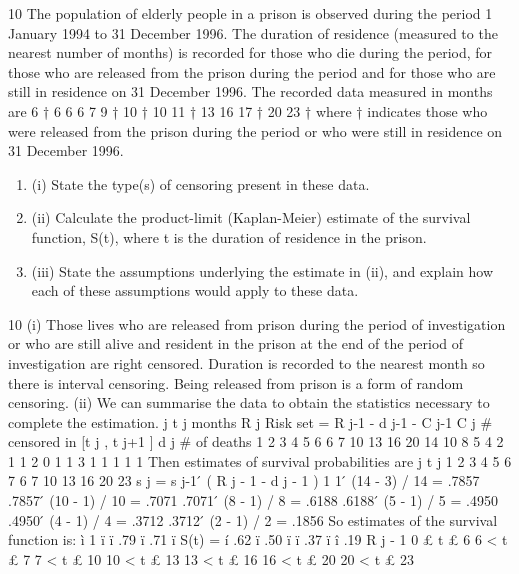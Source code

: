 \documentclass[a4paper,12pt]{article}
\begin{document}
10
The population of elderly people in a prison is observed during the period
1 January 1994 to 31 December 1996. The duration of residence (measured to
the nearest number of months) is recorded for those who die during the
period, for those who are released from the prison during the period and for
those who are still in residence on 31 December 1996.
The recorded data measured in months are
6 † 6 6 6 7 9 †
10 † 10 11 † 13 16 17 †
20 23 †
where † indicates those who were released from the prison during the period
or who were still in residence on 31 December 1996.

\begin{enumerate}
\item (i) State the type(s) of censoring present in these data.
\item (ii) Calculate the product-limit (Kaplan-Meier) estimate of the survival
function, S(t), where t is the duration of residence in the prison.

\item (iii) State the assumptions underlying the estimate in (ii), and explain how
each of these assumptions would apply to these data.

\end{enumerate}

\newpage


10
(i)
Those lives who are released from prison during the period of
investigation or who are still alive and resident in the prison at the end of
the period of investigation are right censored.
Duration is recorded to the nearest month so there is interval censoring.
Being released from prison is a form of random censoring.
(ii)
We can summarise the data to obtain the statistics necessary to complete
the estimation.
j t j
months R j
Risk set
= R j-1 - d j-1 - C j-1 C j
# censored
in [t j , t j+1 ] d j
# of deaths
1
2
3
4
5
6 6
7
10
13
16
20 14
10
8
5
4
2 1
1
2
0
1
1 3
1
1
1
1
1
Then estimates of survival probabilities are
j t j
1
2
3
4
5
6
7 6
7
10
13
16
20
23
s j = s j-1  ́
( R j - 1 - d j - 1 )
1
1  ́ (14 - 3) / 14
= .7857
.7857  ́ (10 - 1) / 10 = .7071
.7071  ́ (8 - 1) / 8 = .6188
.6188  ́ (5 - 1) / 5 = .4950
.4950  ́ (4 - 1) / 4 = .3712
.3712  ́ (2 - 1) / 2 = .1856
So estimates of the survival function is:
ì 1
ï
ï .79
ï .71
ï
S(t) = í .62
ï .50
ï
ï .37
ï
î .19
R j - 1
0 £ t £ 6
6 < t £ 7
7 < t £ 10
10 < t £ 13
13 < t £ 16
16 < t £ 20
20 < t £ 23
\end{document}

